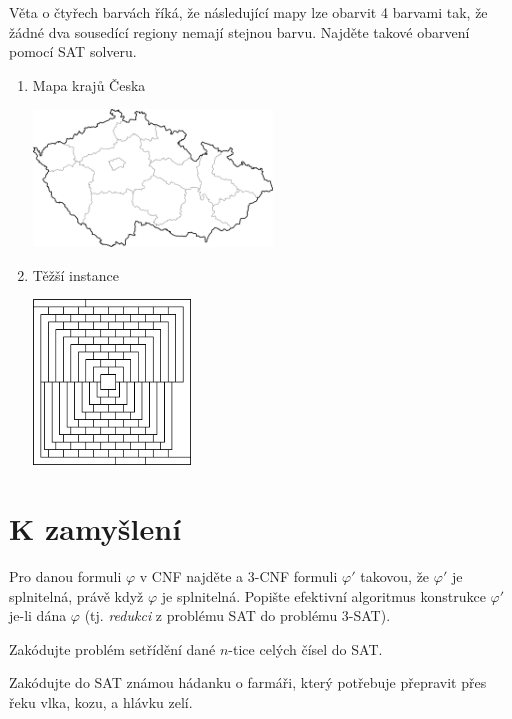     
\begin{problem}

    Věta o čtyřech barvách říká, že následující mapy lze obarvit 4 barvami tak, že žádné dva sousedící regiony nemají stejnou barvu. Najděte takové obarvení pomocí SAT solveru.
    \begin{multicols}{2}
    \begin{enumerate}
        \item Mapa krajů Česka  
        
        \vfill \includegraphics[width=0.5\textwidth]{files/map-coloring-czechia.png} \vfill
        
        \item Těžší instance  
        
        \vfill \includegraphics[width=0.33\textwidth]{files/map-coloring-hard.png} \vfill
    \end{enumerate}
    \end{multicols}

\end{problem}



\section*{K zamyšlení}
    
    
\begin{problem} 
    
    Pro danou formuli $\varphi$ v CNF najděte a 3-CNF formuli $\varphi'$ takovou, že $\varphi'$ je splnitelná, právě když $\varphi$ je splnitelná. Popište efektivní algoritmus konstrukce $\varphi'$ je-li dána $\varphi$ (tj. \emph{redukci} z problému SAT do problému 3-SAT).

\end{problem}


\begin{problem}
    Zakódujte problém setřídění dané $n$-tice celých čísel do SAT.
\end{problem}

\begin{problem}
    Zakódujte do SAT známou hádanku o farmáři, který potřebuje přepravit přes řeku vlka, kozu, a hlávku zelí.
\end{problem}

